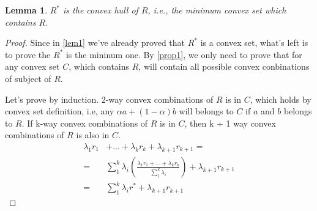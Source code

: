 \documentclass{article}
\newtheorem{lemma}[theorem]{Lemma}
\begin{document}
\begin{lemma}
    $R^*$ is the convex hull of $R$, i.e., the minimum convex set which contains $R$.
\end{lemma}

\begin{proof}
    Since in \cref{lem1} we've already proved that $R^*$ is a convex set, what's left is to prove the $R^*$ is the mininum one. By \cref{prop1}, we only need to prove
    that for any convex set $C$, which contains $R$, will contain all possible convex conbinations of subject of $R$.  

    Let's prove by induction. 2-way convex combinations of $R$ is in $C$, which holds by convex set definition, i.e, any $\alpha{}a + (1 -\alpha)b$ will belongs to $C$ if $a$ and $b$ belongs to $R$. If k-way convex combinations of $R$ is in $C$, then k + 1 way convex combinations of $R$ is also in $C$.
    \begin{align*}
        \lambda_{1}r_{1} & + ... + \lambda_{k}r_{k} + \lambda_{k+1}r_{k+1} = \\
          = & \sum_1^k{\lambda_{i}}(\frac{\lambda_{1}r_{1} + ... + \lambda_{k}r_{k}}{\sum_1^k{\lambda_{i}}}) + \lambda_{k+1}r_{k+1} \\
          = & \sum_1^k{\lambda_{i}} r^{*} + \lambda_{k+1}r_{k+1}
    \end{align*}
\end{proof}
\end{document}
